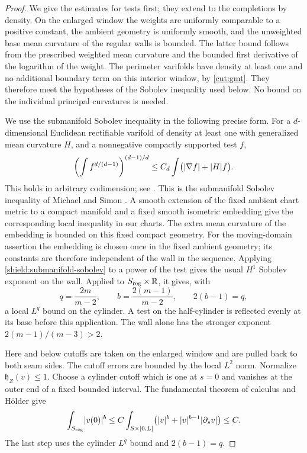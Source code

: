 \begin{proof}
We give the estimates for tests first; they extend to the completions by
density.  On the enlarged window the weights are uniformly comparable
to a positive constant, the ambient geometry is uniformly smooth, and
the unweighted base mean curvature of the regular walls is bounded.
The latter bound follows from the prescribed weighted mean curvature
and the bounded first derivative of the logarithm of the weight.
The perimeter varifolds have density at least one and no additional
boundary term on this interior window, by \cref{cut:gmt}.  They therefore
meet the hypotheses of the Sobolev inequality used below.
No bound on the individual principal curvatures is needed.

We use the submanifold Sobolev inequality in the following precise form.
For a $d$-dimensional Euclidean rectifiable varifold of density at least
one with generalized mean curvature $H$, and a nonnegative compactly
supported test $f$,
\begin{equation}\label{shield:submanifold-sobolev}
 \left(\int f^{d/(d-1)}\right)^{(d-1)/d}
 \le C_d\int\bigl(\lvert\nabla f\rvert+\lvert H\rvert f\bigr).
\end{equation}
This holds in arbitrary codimension; see \citet[Chapter~4, Section~5,
Theorem~5.7]{simonGMT}. This is the submanifold Sobolev inequality
of Michael and Simon \citep{michaelSimon1973}.  A smooth extension of the fixed ambient chart
metric to a compact manifold and a fixed smooth isometric embedding
\citep{nash1956} give the corresponding local inequality in our charts.
The extra mean curvature of the embedding is bounded on this fixed
compact geometry.  For the moving-domain assertion the embedding is chosen once in the
fixed ambient geometry; its constants are therefore independent of the
wall in the sequence.  Applying
\cref{shield:submanifold-sobolev} to a power of the test gives the usual
$H^1$ Sobolev exponent on the wall.  Applied to
$S_{\rm reg}\times\mathbb R$, it gives, with
\[
 q=\frac{2m}{m-2},\qquad b=\frac{2(m-1)}{m-2},
 \qquad 2(b-1)=q,
\]
a local $L^q$ bound on the cylinder.  A test on the half-cylinder is
reflected evenly at its base before this application.  The wall alone
has the stronger exponent $2(m-1)/(m-3)>2$.

Here and below cutoffs are taken on the enlarged window and are pulled
back to both seam sides.  The cutoff errors are bounded by the local
$L^2$ norm.  Normalize $\mathfrak h_Z(v)\le1$.  Choose a cylinder cutoff
which is one at $s=0$ and vanishes at the outer end of a fixed bounded
interval.  The fundamental theorem of calculus and H\"older give
\begin{equation}\label{shield:trace}
 \int_{S_{\rm reg}}\lvert v(0)\rvert^b
 \le C\int_{S\times[0,L]}
       \bigl(\lvert v\rvert^b+\lvert v\rvert^{b-1}\lvert\partial_s v\rvert\bigr)
 \le C.
\end{equation}
The last step uses the cylinder $L^q$ bound and $2(b-1)=q$.


\end{proof}
